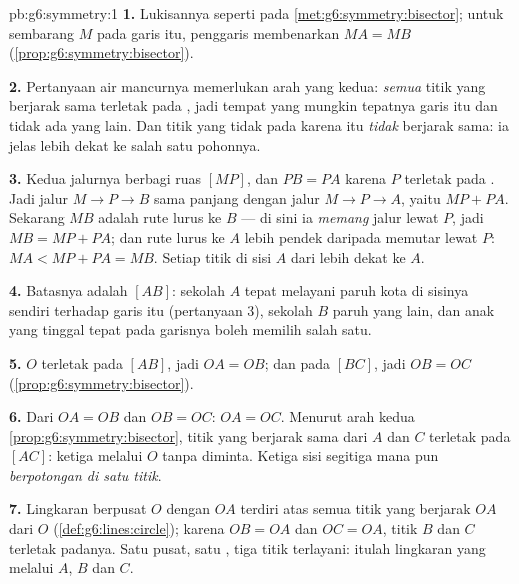 \begin{solution}{pb:g6:symmetry:1}
\textbf{1.} Lukisannya seperti pada \cref{met:g6:symmetry:bisector};
untuk sembarang $M$ pada garis itu, penggaris membenarkan $MA = MB$
(\cref{prop:g6:symmetry:bisector}).

\textbf{2.} Pertanyaan air mancurnya memerlukan arah yang kedua:
\emph{semua} titik yang berjarak sama terletak pada ,
jadi tempat yang mungkin tepatnya garis itu dan tidak ada yang lain.
Dan titik yang tidak pada  karena itu \emph{tidak}
berjarak sama: ia jelas lebih dekat ke salah satu pohonnya.

\textbf{3.} Kedua jalurnya berbagi ruas $[MP]$, dan $PB = PA$ karena
$P$ terletak pada . Jadi jalur $M \to P \to B$ sama
panjang dengan jalur $M \to P \to A$, yaitu $MP + PA$. Sekarang $MB$
adalah rute lurus ke $B$ --- di sini ia \emph{memang} jalur lewat
$P$, jadi $MB = MP + PA$; dan rute lurus ke $A$ lebih pendek daripada
memutar lewat $P$: $MA < MP + PA = MB$. Setiap titik di sisi $A$ dari
 lebih dekat ke $A$.

\textbf{4.} Batasnya adalah  $[AB]$: sekolah $A$ tepat
melayani paruh kota di sisinya sendiri terhadap garis itu (pertanyaan
3), sekolah $B$ paruh yang lain, dan anak yang tinggal tepat pada
garisnya boleh memilih salah satu.

\textbf{5.} $O$ terletak pada  $[AB]$, jadi $OA = OB$;
dan pada  $[BC]$, jadi $OB = OC$
(\cref{prop:g6:symmetry:bisector}).

\textbf{6.} Dari $OA = OB$ dan $OB = OC$: $OA = OC$. Menurut arah
kedua \cref{prop:g6:symmetry:bisector}, titik yang berjarak sama dari
$A$ dan $C$ terletak pada  $[AC]$:  ketiga
melalui $O$ tanpa diminta. Ketiga  sisi segitiga mana pun
\emph{berpotongan di satu titik}.

\textbf{7.} Lingkaran berpusat $O$ dengan  $OA$ terdiri atas
semua titik yang berjarak $OA$ dari $O$
(\cref{def:g6:lines:circle}); karena $OB = OA$ dan $OC = OA$, titik
$B$ dan $C$ terletak padanya. Satu pusat, satu , tiga titik
terlayani: itulah lingkaran yang melalui $A$, $B$ dan $C$.


\end{solution}
